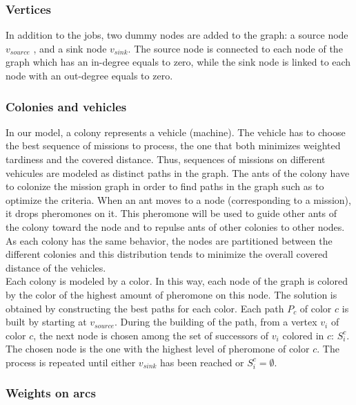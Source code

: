 \documentclass[review]{elsarticle}
\begin{document}
\subsubsection{Vertices}

In addition to the jobs, two dummy nodes are added to the graph: a source node $v_{source}$ , and a sink node $v_{sink}$. The source node is connected to each node of the graph which has an in-degree equals to zero, while the sink node is linked to each node with an out-degree equals to zero. %

\subsubsection{Colonies and vehicles}

In our model, a colony represents a vehicle (machine). The vehicle has to choose the best sequence of missions to process, the one that both minimizes weighted tardiness and the covered distance. Thus, sequences of missions on different vehicules are modeled as distinct paths in the graph. The ants of the colony have to colonize the mission graph in order to find paths in the graph such as to optimize the criteria. When an ant moves to a node (corresponding to a mission), it drops pheromones on it. This pheromone will be used to guide other ants of the colony toward the node and to repulse ants of other colonies to other nodes. As each colony has the same behavior, the nodes are partitioned between the different colonies and this distribution tends to minimize the overall covered distance of the vehicles.\\

Each colony is modeled by a color. In this way, each node of the graph is colored by the color of the highest amount of pheromone on this node. The solution is obtained by constructing the best paths for each color. Each path $P_c$ of color $c$ is built by starting at $v_{source}$. During the building of the path, from a vertex $v_i$ of color $c$, the next node is chosen among the set of successors of $v_i$ colored in $c$: $S_i^c$. The chosen node is the one with the highest level of pheromone of color $c$. The process is repeated until either $v_{sink}$ has been reached or $S_i^c = \emptyset$.

\subsubsection{Weights on arcs}
\end{document}
